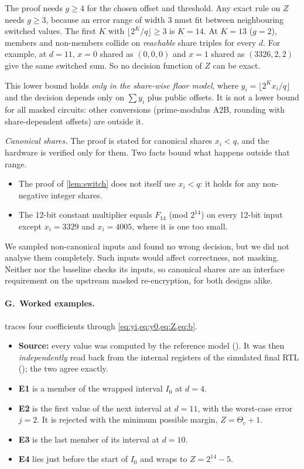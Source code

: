\begin{remark}\label{rem:k13}
The proof needs $g \ge 4$ for the chosen offset and threshold. Any exact rule on $Z$ needs $g \ge 3$, because an error range of width 3 must fit between neighbouring switched values. The first $K$ with $\lfloor 2^K/q \rfloor \ge 3$ is $K = 14$. At $K = 13$ ($g = 2$), members and non-members collide on \emph{reachable} share triples for every $d$. For example, at $d = 11$, $x = 0$ shared as $(0, 0, 0)$ and $x = 1$ shared as $(3326, 2, 2)$ give the same switched sum. So no decision function of $Z$ can be exact.

This lower bound holds \emph{only in the share-wise floor model}, where $y_i = \lfloor 2^K x_i/q \rfloor$ and the decision depends only on $\sum y_i$ plus public offsets. It is not a lower bound for all masked circuits: other conversions (prime-modulus A2B, rounding with share-dependent offsets) are outside it.
\end{remark}

\emph{Canonical shares.} The proof is stated for canonical shares $x_i < q$, and the hardware is verified only for them. Two facts bound what happens outside that range.
\begin{itemize}
  \item The proof of \cref{lem:switch} does not itself use $x_i < q$: it holds for any non-negative integer shares.
  \item The 12-bit constant multiplier equals $F_{14}$ (mod $2^{14}$) on every 12-bit input except $x_i = 3329$ and $x_i = 4005$, where it is one too small.
\end{itemize}
We sampled non-canonical inputs and found no wrong decision, but we did not analyse them completely. Such inputs would affect correctness, not masking. Neither \PAMS{} nor the baseline checks its inputs, so canonical shares are an interface requirement on the upstream masked re-encryption, for both designs alike.

\paragraph{G.~Worked examples.}  traces four coefficients through \cref{eq:yi,eq:y0,eq:Z,eq:b}.
\begin{itemize}
  \item \textbf{Source:} every value was computed by the reference model (). It was then \emph{independently} read back from the internal registers of the simulated final RTL (); the two agree exactly.
  \item \textbf{E1} is a member of the wrapped interval $I_0$ at $d = 4$.
  \item \textbf{E2} is the first value of the next interval at $d = 11$, with the worst-case error $j = 2$. It is rejected with the minimum possible margin, $Z = \Theta_c + 1$.
  \item \textbf{E3} is the last member of its interval at $d = 10$.
  \item \textbf{E4} lies just before the start of $I_0$ and wraps to $Z = 2^{14} - 5$.
\end{itemize}

